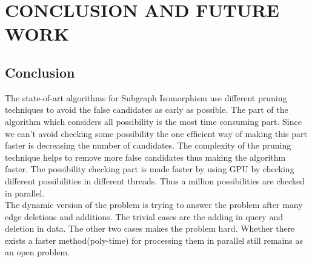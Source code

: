 \chapter{CONCLUSION AND FUTURE WORK}
\label{chap:concl}

\section{Conclusion}

\hspace{10mm} The state-of-art algorithms for Subgraph Isomorphism use different pruning techniques to avoid the false candidates as early as possible.  The part of the algorithm which considers all possibility is the most time consuming part. Since we can't avoid checking some possibility the one efficient way of making this part faster is decreasing the number of candidates. The complexity of the pruning technique helps to remove more false candidates thus  making the algorithm faster. The possibility checking part is made faster by using GPU by checking different possibilities in different threads. Thus a million possibilities are checked in parallel.\\
\hspace{10mm} The dynamic version of the problem is trying to answer the problem after many edge deletions and additions. The trivial cases are the adding in query and deletion in data. The other two cases makes the problem hard. Whether there exists a faster method(poly-time) for processing them in parallel still remains as an open problem. 


